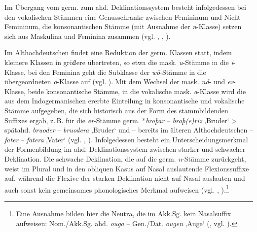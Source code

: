 Im Übergang vom germ. zum ahd. Deklinationssystem besteht infolgedessen bei den vokalischen Stämmen eine Genusschranke zwischen Femininum und Nicht-Femininum, die konsonantischen Stämme (mit Ausnahme der \textit{n}{}-Klasse) setzen sich aus Maskulina und Feminina zusammen (vgl. , \citealt[77]{Kürschner2008a}, \citealt[§3]{Paul1968}).

Im Althochdeutschen findet eine Reduktion der germ. Klassen statt, indem kleinere Klassen in größere übertreten, so etwa die mask. \textit{u}{}-Stämme in die \textit{i}{}-Klasse, bei den Feminina geht die Subklasse der \textit{wō}{}-Stämme in die übergeordneten \textit{ō}{}-Klasse auf (vgl. ). Mit dem Wechsel der mask. \textit{nd}{}- und \textit{er}{}-Klasse, beide konsonantische Stämme, in die vokalische mask. \textit{a}{}-Klasse wird die aus dem Indogermanischen ererbte Einteilung in konsonantische und vokalische Stämme aufgegeben, die sich historisch aus der Form des stammbildenden Suffixes ergab, z.\,B. für die \textit{er}{}-Stämme germ. *\textit{brōþar} -- \textit{brōþ(e)riz} ‚Bruder‘ > spätahd. \textit{bruoder} -- \textit{bruodera} ‚Bruder‘ und -- bereits im älteren Althochdeutschen -- \textit{fater} -- \textit{fatera} ‚Vater‘ (vgl. \citealt[§235]{BrauneHeidermanns2018}, \citealt[75]{Kürschner2008a}). Infolgedessen besteht ein Unterscheidungsmerkmal der Formenbildung im ahd. Deklinationssystem zwischen starker und schwacher Deklination. Die schwache Deklination, die auf die germ. \textit{n}{}-Stämme zurückgeht, weist im Plural und in den obliquen Kasus auf Nasal auslautende Flexionssuffixe auf, während die Flexive der starken Deklination nicht auf Nasal auslauten und auch sonst kein gemeinsames phonologisches Merkmal aufweisen (vgl. \citealt[304--305]{Fortson2007}, \citealt[80]{Kürschner2008a}).\footnote{Eine Ausnahme bilden hier die Neutra, die im Akk.Sg. kein Nasalsuffix aufweisen: Nom.\slash Akk.Sg. ahd. \textit{ouga} -- Gen./Dat. \textit{ougen} ‚Auge‘ (\citealt[§224]{BrauneHeidermanns2018}, vgl. \citealt[85]{Kürschner2008a}).}

